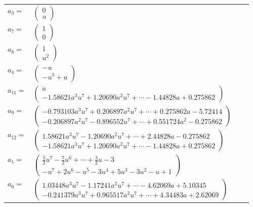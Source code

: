 \documentclass[1p]{elsarticle_modified}
\theoremstyle{definition}
\begin{document}
\begin{tabular}{m{7pt} m{180pt} m{7pt} m{180pt} }
\flushright $a_{3}=$&$\begin{pmatrix}0\\u\end{pmatrix}$ \\
\flushright $a_{7}=$&$\begin{pmatrix}1\\0\end{pmatrix}$ \\
\flushright $a_{8}=$&$\begin{pmatrix}1\\u^2\end{pmatrix}$ \\
\flushright $a_{4}=$&$\begin{pmatrix}- u\\- u^3+u\end{pmatrix}$ \\
\flushright $a_{11}=$&$\begin{pmatrix}a\\-1.58621 a^{3} u^{7}+1.20690 a^{2} u^{7}+\cdots-1.44828 a+0.275862\end{pmatrix}$ \\
\flushright $a_{9}=$&$\begin{pmatrix}-0.793103 a^{3} u^{7}+0.206897 a^{2} u^{7}+\cdots+0.275862 a-5.72414\\-0.206897 a^{2} u^{7}-0.896552 u^{7}+\cdots+0.551724 a^{2}-0.275862\end{pmatrix}$ \\
\flushright $a_{12}=$&$\begin{pmatrix}1.58621 a^{3} u^{7}-1.20690 a^{2} u^{7}+\cdots+2.44828 a-0.275862\\-1.58621 a^{3} u^{7}+1.20690 a^{2} u^{7}+\cdots-1.44828 a+0.275862\end{pmatrix}$ \\
\flushright $a_{1}=$&$\begin{pmatrix}\frac{3}{2} u^7-\frac{7}{2} u^6+\cdots+\frac{3}{2} u-3\\- u^7+2 u^6- u^5-3 u^4+5 u^3-3 u^2- u+1\end{pmatrix}$ \\
\flushright $a_{6}=$&$\begin{pmatrix}1.03448 a^{3} u^{7}-1.17241 a^{2} u^{7}+\cdots-4.62069 a+5.10345\\-0.241379 a^{3} u^{7}+0.965517 a^{2} u^{7}+\cdots+4.34483 a+2.62069\end{pmatrix}$ \\

\end{tabular}
\end{document}
